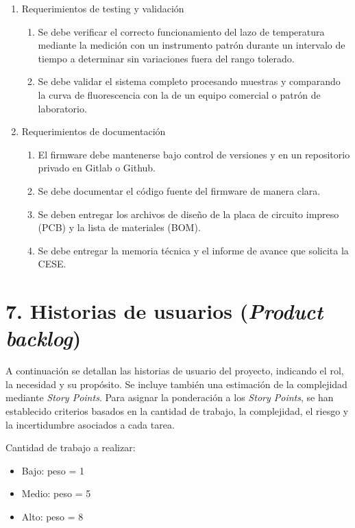 \documentclass[
11pt, %
]{charter}
\begin{document}
\begin{enumerate}
\begin{enumerate}
			\item La interfaz gráfica debe permitir configurar el modo de operación, iniciar o detener el ensayo, visualizar el estado actual y los resultados finales.
		\end{enumerate}
		\item Requerimientos de testing y validación
	\begin{enumerate}
			\item Se debe verificar el correcto funcionamiento del lazo de temperatura mediante la medición con un instrumento patrón durante un intervalo de tiempo a determinar sin variaciones fuera del rango tolerado.
			\item Se debe validar el sistema completo procesando muestras y comparando la curva de fluorescencia con la de un equipo comercial o patrón de laboratorio.
		\end{enumerate}
		\item Requerimientos de documentación
	\begin{enumerate}
			\item El firmware debe mantenerse bajo control de versiones y en un repositorio privado en Gitlab o Github.	
			\item Se debe documentar el código fuente del firmware de manera clara.
			\item Se deben entregar los archivos de diseño de la placa de circuito impreso (PCB) y la lista de materiales (BOM).
			\item Se debe entregar la memoria técnica y el informe de avance que solicita la CESE.
		\end{enumerate}

\end{enumerate}

\section{7. Historias de usuarios (\textit{Product backlog})}
\label{sec:backlog}

A continuación se detallan las historias de usuario del proyecto, indicando el rol, la necesidad y su propósito. Se incluye también una estimación de la complejidad mediante \textit{Story Points}. Para asignar la ponderación a los \textit{Story Points}, se han establecido criterios basados en la cantidad de trabajo, la complejidad, el riesgo y la incertidumbre asociados a cada tarea.

Cantidad de trabajo a realizar:
\begin{itemize}
    \item Bajo: peso = 1
    \item Medio: peso = 5
    \item Alto: peso = 8
\end{itemize}
\end{document}

